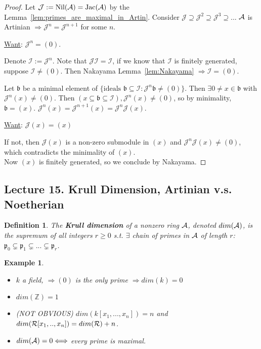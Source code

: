 \documentclass[11pt]{article}
\newtheorem{dfn}[thm]{Definition}
\newtheorem{ex}[thm]{Example}
\newcommand{\intg}{\mathbb Z}
\newcommand{\scb}{{\mathfrak b}}
\newcommand{\scp}{{\mathfrak p}}
\newcommand{\cala}{{\cal A}}
\newcommand{\calr}{{\cal R}}
\newcommand{\Lrta}{\Longrightarrow}
\newcommand{\Llrta}{\Longleftrightarrow}
\begin{document}
\begin{proof}
Let $\mathcal{J}:= \text{Nil}(  \cala)=\text{Jac}(\cala)$ by the Lemma~\ref{lem:primes_are_maximal_in_Artin}. Consider $\mathcal{J}\supseteq \mathcal{J}^2\supseteq \mathcal{J}^3\supseteq ...$ $\cala$ is Artinian   $\Lrta \mathcal{J}^n=\mathcal{J}^{n+1}$ for some $n$.

 \underline{Want}: $\mathcal{J}^n=(0)$.

Denote $\mathcal{I}:=\mathcal{J}^n$. Note that $\mathcal{J}\mathcal{I}=\mathcal{I}$, if we know that $\mathcal{I}$ is finitely generated, suppose $\mathcal{I}\neq (0)$. Then Nakayama Lemma~\ref{lem:Nakayama} $\Lrta \mathcal{I}=(0)$.

Let $\scb$ be a minimal element of $\{\text{ideals $\scb\subseteq \mathcal{I}:\mathcal{J}^n\scb\neq (0)$}\}$. Then $\exists 0\neq x\in \scb$ with $\mathcal{J}^n(x)\neq (0)$. Then $(x\subseteq \scb\subseteq \mathcal{I}), \mathcal{J}^n (x)\neq (0)$, so by minimality, $\scb=(x)$.
$\mathcal{J}^n(x)=\mathcal{J}^{n+1}(x)=\mathcal{J}^n\mathcal{J}(x)$.

\underline{Want}: $\mathcal{J}(x)=(x)$

If not, then $\mathcal{J}(x)$ is a non-zero submodule in $(x)$ and $\mathcal{J}^n\mathcal{J}(x)\neq (0)$, which contradicts the minimality of $(x)$.\\
Now $(x)$ is finitely generated, so we conclude by Nakayama.
\end{proof}
\subsection{Lecture 15. Krull Dimension, Artinian v.s. Noetherian}
\begin{dfn}
The \textbf{Krull dimension} of a nonzero ring $\cala$, denoted $dim(\cala)$, is the supremum of all integers $r\geq 0$ s.t. $\exists$ chain of primes in $\cala$ of length $r$: 
$\scp_0\subsetneq \scp_1\subsetneq...\subsetneq \scp_r$.
\end{dfn}

\begin{ex}\ 
\begin{itemize}
\item $k$ a field, $\Lrta (0)$ is the only prime $\Lrta dim(k)=0$
\item $dim(\intg)=1$
\item (NOT OBVIOUS) $dim(k[x_1,...,x_n])=n$
 and $dim(\calr[x_1,..,x_n])=dim(\calr)+n$.
\item $dim(\cala)=0\Llrta $ every prime is maximal.  
\end{itemize}
\end{ex}
\end{document}
